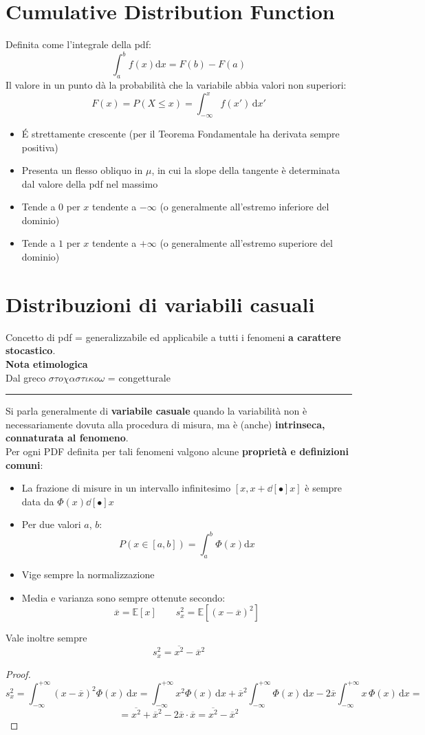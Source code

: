 \documentclass[10pt, oneside]{book}
\newcommand{\infobox}[2]{\vspace{0.5cm}~\\ \textbf{#1} \hrulefill \vspace{0.2cm}\\#2 {}\,\\\hrule \vspace{0.5cm}}
\begin{document}
\section{Cumulative Distribution Function}
Definita come l'integrale della pdf:
\[\int_{a}^{b} f(x)\mathrm{d}x = F(b) - F(a)\]
Il valore in un punto dà la probabilità che la variabile abbia valori non superiori:
\[F(x) = P(X \leq x) = \int_{-\infty}^{x} f(x') \, \mathrm{d}x'\]
\begin{itemize}
\item \'E strettamente crescente (per il Teorema Fondamentale ha derivata sempre positiva)
\item Presenta un flesso obliquo in $\mu$, in cui la slope della tangente è determinata dal valore della pdf nel massimo
\item Tende a $0$ per $x$ tendente a $-\infty$ (o generalmente all'estremo inferiore del dominio)
\item Tende a $1$ per $x$ tendente a $+\infty$ (o generalmente all'estremo superiore del dominio)
\end{itemize}

\section{Distribuzioni di variabili casuali}
Concetto di pdf = generalizzabile ed applicabile a tutti i fenomeni \textbf{a carattere stocastico}.
\infobox{Nota etimologica}{Dal greco
$\sigma \tau o \chi \alpha \sigma \tau \iota \kappa o \omega$ = congetturale }
Si parla generalmente di \textbf{variabile casuale} quando la variabilità non è necessariamente dovuta alla procedura di misura, ma è (anche) \textbf{intrinseca, connaturata al fenomeno}.\\
Per ogni PDF definita per tali fenomeni valgono alcune \textbf{proprietà e definizioni comuni}:
\begin{itemize}
\item La frazione di misure in un intervallo infinitesimo $[x, x+\dd[•]{x}]$ è sempre data da $\Phi(x) \dd[•]{x}$
\item Per due valori $a$, $b$:
\[P(x \in [a,b]) = \int_{a}^{b}\Phi(x)\mathrm{d}x\]
\item Vige sempre la normalizzazione
\item Media e varianza sono sempre ottenute secondo:
\[\overline{x} = \mathbb{E}[x] \qquad s_x^2 = \mathbb{E}[(x - \overline{x})^2]\]
\end{itemize}
Vale inoltre sempre
\[s_x^2 = \overline{x^2} - \overline{x}^2\]
\begin{proof}
\[s_x^2 = \int_{-\infty}^{+\infty} (x-\overline{x})^2 \Phi(x) \, \mathrm{d}x = \int_{-\infty}^{+\infty} x^2 \Phi(x) \, \mathrm{d}x + \overline{x}^2 \int_{-\infty}^{+\infty} \Phi(x) \, \mathrm{d}x - 2 \overline{x} \int_{-\infty}^{+\infty} x \, \Phi(x) \, \mathrm{d}x =\]
\[= \overline{x^2} + \overline{x}^2 - 2 \overline{x} \cdot \overline{x} = \overline{x^2} - \overline{x}^2\]
\end{proof}
\end{document}
